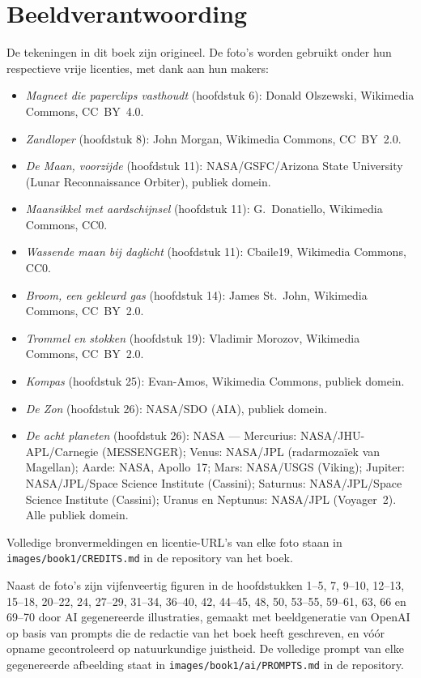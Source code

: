 \chapter*{Beeldverantwoording}

De tekeningen in dit boek zijn origineel. De foto's worden gebruikt
onder hun respectieve vrije licenties, met dank aan hun makers:

\begin{itemize}
  \item \emph{Magneet die paperclips vasthoudt} (hoofdstuk 6): Donald
        Olszewski, Wikimedia Commons, CC~BY~4.0.
  \item \emph{Zandloper} (hoofdstuk 8): John Morgan, Wikimedia
        Commons, CC~BY~2.0.
  \item \emph{De Maan, voorzijde} (hoofdstuk 11): NASA/GSFC/Arizona
        State University (Lunar Reconnaissance Orbiter), publiek
        domein.
  \item \emph{Maansikkel met aardschijnsel} (hoofdstuk 11):
        G.~Donatiello, Wikimedia Commons, CC0.
  \item \emph{Wassende maan bij daglicht} (hoofdstuk 11): Cbaile19,
        Wikimedia Commons, CC0.
  \item \emph{Broom, een gekleurd gas} (hoofdstuk 14): James
        St.~John, Wikimedia Commons, CC~BY~2.0.
  \item \emph{Trommel en stokken} (hoofdstuk 19): Vladimir
        Morozov, Wikimedia Commons, CC~BY~2.0.
  \item \emph{Kompas} (hoofdstuk 25): Evan-Amos, Wikimedia Commons,
        publiek domein.
  \item \emph{De Zon} (hoofdstuk 26): NASA/SDO (AIA), publiek
        domein.
  \item \emph{De acht planeten} (hoofdstuk 26): NASA ---
        Mercurius: NASA/JHU-APL/Carnegie (MESSENGER); Venus:
        NASA/JPL (radarmozaïek van Magellan); Aarde: NASA, Apollo~17;
        Mars: NASA/USGS (Viking); Jupiter: NASA/JPL/Space Science
        Institute (Cassini); Saturnus: NASA/JPL/Space Science
        Institute (Cassini); Uranus en Neptunus: NASA/JPL
        (Voyager~2). Alle publiek domein.
\end{itemize}

Volledige bronvermeldingen en licentie-URL's van elke foto staan in
\texttt{images/book1/CREDITS.md} in de repository van het boek.

\bigskip
Naast de foto's zijn vijfenveertig figuren in de hoofdstukken 1--5, 7,
9--10, 12--13, 15--18, 20--22, 24, 27--29, 31--34, 36--40, 42,
44--45, 48, 50, 53--55, 59--61, 63, 66 en 69--70 door AI gegenereerde
illustraties, gemaakt met beeldgeneratie van OpenAI op basis van
prompts die de redactie van het boek heeft geschreven, en vóór opname
gecontroleerd op natuurkundige juistheid. De volledige prompt van elke
gegenereerde afbeelding staat in
\texttt{images/book1/ai/PROMPTS.md} in de repository.
\clearpage
